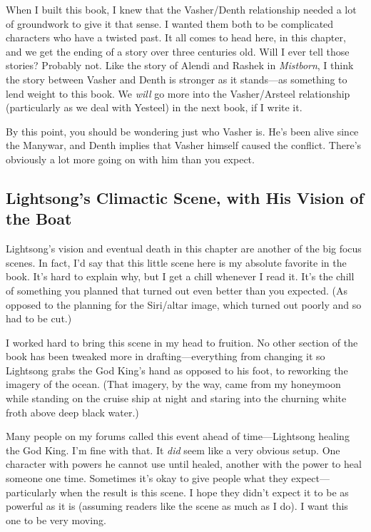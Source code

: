When I built this book, I knew that the Vasher/Denth relationship needed a lot of groundwork to give it that sense. I wanted them both to be complicated characters who have a twisted past. It all comes to head here, in this chapter, and we get the ending of a story over three centuries old. Will I ever tell those stories? Probably not. Like the story of Alendi and Rashek in \textit{Mistborn}, I think the story between Vasher and Denth is stronger as it stands—as something to lend weight to this book. We \textit{will} go more into the Vasher/Arsteel relationship (particularly as we deal with Yesteel) in the next book, if I write it.

By this point, you should be wondering just who Vasher is. He’s been alive since the Manywar, and Denth implies that Vasher himself caused the conflict. There’s obviously a lot more going on with him than you expect.

\subsection*{Lightsong’s Climactic Scene, with His Vision of the Boat}

Lightsong’s vision and eventual death in this chapter are another of the big focus scenes. In fact, I’d say that this little scene here is my absolute favorite in the book. It’s hard to explain why, but I get a chill whenever I read it. It’s the chill of something you planned that turned out even better than you expected. (As opposed to the planning for the Siri/altar image, which turned out poorly and so had to be cut.)

I worked hard to bring this scene in my head to fruition. No other section of the book has been tweaked more in drafting—everything from changing it so Lightsong grabs the God King’s hand as opposed to his foot, to reworking the imagery of the ocean. (That imagery, by the way, came from my honeymoon while standing on the cruise ship at night and staring into the churning white froth above deep black water.)

Many people on my forums called this event ahead of time—Lightsong healing the God King. I’m fine with that. It \textit{did} seem like a very obvious setup. One character with powers he cannot use until healed, another with the power to heal someone one time. Sometimes it’s okay to give people what they expect—particularly when the result is this scene. I hope they didn’t expect it to be as powerful as it is (assuming readers like the scene as much as I do). I want this one to be very moving.

